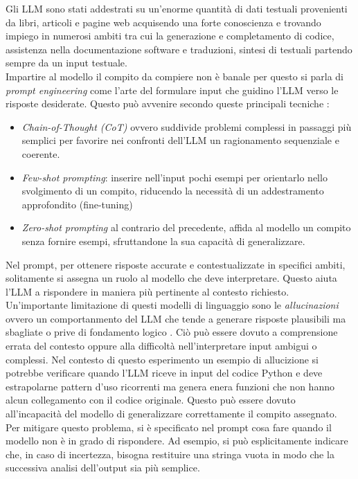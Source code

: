 \documentclass{article}
\begin{document}
Gli LLM sono stati addestrati su un'enorme quantità di dati testuali provenienti da libri, articoli e pagine web acquisendo una forte conoscienza e trovando impiego in numerosi ambiti tra cui la generazione e completamento di codice, assistenza nella documentazione software e traduzioni, sintesi di testuali \cite{di2025use} partendo sempre da un input testuale.\\
Impartire al modello il compito da compiere non è banale per questo si parla di \textit{prompt engineering} come l'arte del formulare input che guidino l'LLM verso le risposte desiderate. Questo può avvenire secondo queste principali tecniche \cite{di2025use}:
\begin{itemize}
    \item \textit{Chain-of-Thought (CoT)} ovvero suddivide problemi complessi in passaggi più semplici per favorire nei confronti dell'LLM un ragionamento sequenziale e coerente.
    \item \textit{Few-shot prompting}: inserire nell'input pochi esempi per orientarlo nello svolgimento di un compito, riducendo la necessità di un addestramento approfondito (fine-tuning)
    \item \textit{Zero-shot prompting} al contrario del precedente, affida al modello un compito senza fornire esempi, sfruttandone la sua capacità di generalizzare.
\end{itemize}
Nel prompt, per ottenere risposte accurate e contestualizzate in specifici ambiti, solitamente si assegna un ruolo al modello che deve interpretare. Questo aiuta l'LLM a rispondere in maniera più pertinente al contesto richiesto.\\
Un'importante limitazione di questi modelli di linguaggio sono le \textit{allucinazioni} ovvero un comportanmento del LLM che tende a generare risposte plausibili ma sbagliate o prive di fondamento logico \cite{di2025use}. Ciò può essere dovuto a comprensione errata del contesto oppure alla difficoltà nell’interpretare input ambigui o complessi. Nel contesto di questo esperimento un esempio di allucizione si potrebbe verificare quando l'LLM riceve in input del codice Python e deve estrapolarne pattern d'uso ricorrenti ma genera enera funzioni che non hanno alcun collegamento con il codice originale. Questo può essere dovuto all’incapacità del modello di generalizzare correttamente il compito assegnato. Per mitigare questo problema, si è specificato nel prompt cosa fare quando il modello non è in grado di rispondere. Ad esempio, si può esplicitamente indicare che, in caso di incertezza, bisogna restituire una stringa vuota in modo che la successiva analisi dell'output sia più semplice.
\end{document}
